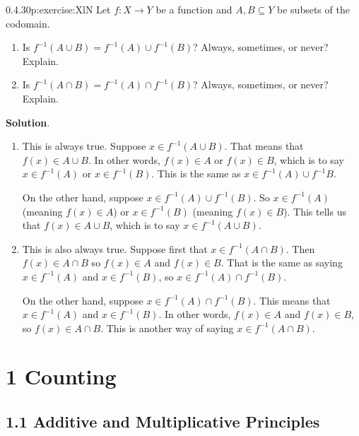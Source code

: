 \documentclass[twoside,11pt,]{book}
\newcommand{\blocktitlefont}{\relax}
\numberwithin{equation}{chapter}
\newcommand{\inv}{^{-1}}
\begin{document}
\begin{divisionsolution}{0.4.30}{}{p:exercise:XlN}%
Let \(f:X \to Y\) be a function and \(A, B \subseteq Y\) be subsets of the codomain.%
\begin{enumerate}[label=(\alph*)]
\item{}Is \(f\inv(A \cup B) = f\inv(A) \cup f\inv(B)\)? Always, sometimes, or never? Explain.%
\item{}Is \(f\inv(A \cap B) = f\inv(A) \cap f\inv(B)\)? Always, sometimes, or never? Explain.%
\end{enumerate}
%
\par\smallskip%
\noindent\textbf{\blocktitlefont Solution}.\quad{}%
\begin{enumerate}[label=(\alph*)]
\item{}This is always true. Suppose \(x \in f\inv(A \cup B)\). That means that \(f(x) \in A \cup B\). In other words, \(f(x) \in A\) or \(f(x) \in B\), which is to say \(x \in f\inv(A)\) or \(x\in f\inv(B)\). This is the same as \(x \in f\inv(A) \cup f\inv B\).%
\par
On the other hand, suppose \(x \in f\inv(A) \cup f\inv(B)\). So \(x \in f\inv(A)\) (meaning \(f(x) \in A\)) or \(x \in f\inv(B)\) (meaning \(f(x) \in B\)). This tells us that \(f(x) \in A \cup B\), which is to say \(x \in f\inv(A \cup B)\).%
\item{}This is also always true. Suppose first that \(x \in f\inv(A \cap B)\). Then \(f(x) \in A \cap B\) so \(f(x) \in A\) and \(f(x) \in B\). That is the same as saying \(x \in f\inv(A)\) and \(x \in f\inv(B)\), so \(x \in f\inv(A) \cap f\inv(B)\).%
\par
On the other hand, suppose \(x \in f\inv(A) \cap f\inv(B)\). This means that \(x \in f\inv(A)\) and \(x \in f\inv(B)\). In other words, \(f(x) \in A\) and \(f(x) \in B\), so \(f(x) \in A \cap B\). This is another way of saying \(x \in f\inv(A \cap B)\).%
\end{enumerate}
%
\end{divisionsolution}%
\chapter*{1 Counting}
\section*{1.1 Additive and Multiplicative Principles}
\end{document}
